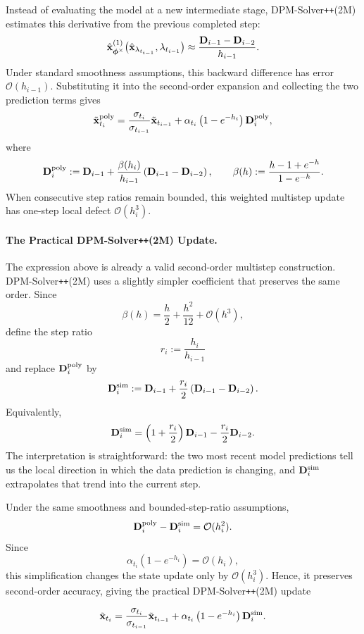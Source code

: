 Instead of evaluating the model at a new intermediate stage,
DPM-Solver\texttt{++}(2M) estimates this derivative from the previous
completed step:
\[
\hat{{\mathbf{x}}}_{\bm{\phi}^\times}^{(1)}
\bigl(
\hat{{\mathbf{x}}}_{\lambda_{t_{i-1}}},
\lambda_{t_{i-1}}
\bigr)
\approx
\frac{
{\mathbf{D}}_{i-1}-{\mathbf{D}}_{i-2}
}{
h_{i-1}
}.
\]
Under standard smoothness assumptions, this backward difference has error
$\mathcal O(h_{i-1})$. Substituting it into the second-order expansion and
collecting the two prediction terms gives
\[
\tilde{{\mathbf{x}}}_{t_i}^{\mathrm{poly}}
=
\frac{\sigma_{t_i}}{\sigma_{t_{i-1}}}
\tilde{{\mathbf{x}}}_{t_{i-1}}
+
\alpha_{t_i}
\left(
1-e^{-h_i}
\right)
{\mathbf{D}}_i^{\mathrm{poly}},
\]
where
\[
{\mathbf{D}}_i^{\mathrm{poly}}
:=
{\mathbf{D}}_{i-1}
+
\frac{\beta(h_i)}{h_{i-1}}
\left(
{\mathbf{D}}_{i-1}-{\mathbf{D}}_{i-2}
\right),
\qquad
\beta(h)
:=
\frac{
h-1+e^{-h}
}{
1-e^{-h}
}.
\]
When consecutive step ratios remain bounded, this weighted multistep update
has one-step local defect $\mathcal O(h_i^3)$.

\paragraph{The Practical DPM-Solver\texttt{++}(2M) Update.}
The expression above is already a valid second-order multistep construction.
DPM-Solver\texttt{++}(2M) uses a slightly simpler coefficient that preserves
the same order. Since
\[
\beta(h)
=
\frac{h}{2}
+
\frac{h^2}{12}
+
\mathcal O(h^3),
\]
define the step ratio
\[
r_i
:=
\frac{h_i}{h_{i-1}}
\]
and replace ${\mathbf{D}}_i^{\mathrm{poly}}$ by
\[
{\mathbf{D}}_i^{\mathrm{sim}}
:=
{\mathbf{D}}_{i-1}
+
\frac{r_i}{2}
\left(
{\mathbf{D}}_{i-1}-{\mathbf{D}}_{i-2}
\right).
\]
Equivalently,
\[
{\mathbf{D}}_i^{\mathrm{sim}}
=
\left(
1+\frac{r_i}{2}
\right){\mathbf{D}}_{i-1}
-
\frac{r_i}{2}{\mathbf{D}}_{i-2}.
\]
The interpretation is straightforward: the two most recent model predictions
tell us the local direction in which the data prediction is changing, and
${\mathbf{D}}_i^{\mathrm{sim}}$ extrapolates that trend into the current step.

Under the same smoothness and bounded-step-ratio assumptions,
\[
{\mathbf{D}}_i^{\mathrm{poly}}
-
{\mathbf{D}}_i^{\mathrm{sim}}
=
\mathcal O(h_i^2).
\]
Since
\[
\alpha_{t_i}
\left(
1-e^{-h_i}
\right)
=
\mathcal O(h_i),
\]
this simplification changes the state update only by
$\mathcal O(h_i^3)$. Hence, it preserves second-order accuracy, giving the
practical DPM-Solver\texttt{++}(2M) update
\begin{mdframed}
\[
\tilde{{\mathbf{x}}}_{t_i}
=
\frac{\sigma_{t_i}}{\sigma_{t_{i-1}}}
\tilde{{\mathbf{x}}}_{t_{i-1}}
+
\alpha_{t_i}
\left(
1-e^{-h_i}
\right)
{\mathbf{D}}_i^{\mathrm{sim}}.
\]
\end{mdframed}

